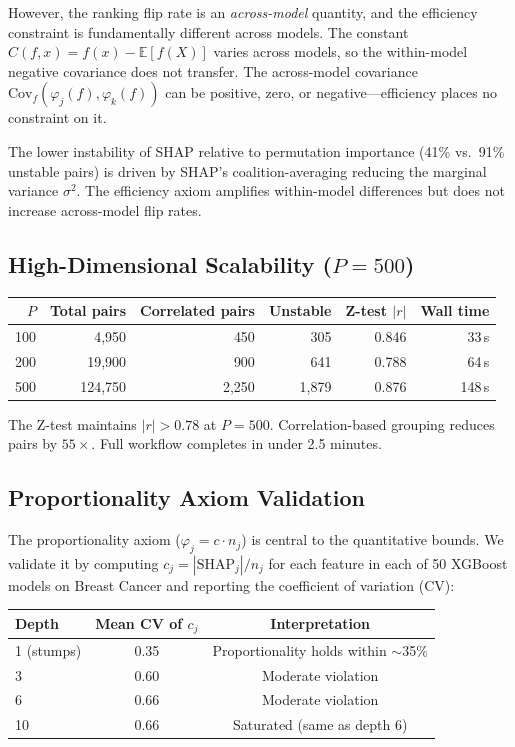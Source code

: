 \documentclass{jmlr}
\newcommand{\E}{\mathbb{E}}
\begin{document}
However, the ranking flip rate is an \emph{across-model} quantity, and the efficiency constraint is fundamentally different across models. The constant $C(f,x) = f(x) - \E[f(X)]$ varies across models, so the within-model negative covariance does not transfer. The across-model covariance $\text{Cov}_f(\varphi_j(f), \varphi_k(f))$ can be positive, zero, or negative---efficiency places no constraint on it.

The lower instability of SHAP relative to permutation importance (41\% vs.\ 91\% unstable pairs) is driven by SHAP's coalition-averaging reducing the marginal variance $\sigma^2$. The efficiency axiom amplifies within-model differences but does not increase across-model flip rates.

\subsection{High-Dimensional Scalability ($P = 500$)}

\begin{center}
\small
\begin{tabular}{@{}rrrrrr@{}}
\toprule
$P$ & Total pairs & Correlated pairs & Unstable & Z-test $|r|$ & Wall time \\
\midrule
100 & 4,950 & 450 & 305 & 0.846 & 33\,s \\
200 & 19,900 & 900 & 641 & 0.788 & 64\,s \\
500 & 124,750 & 2,250 & 1,879 & 0.876 & 148\,s \\
\bottomrule
\end{tabular}
\end{center}

The Z-test maintains $|r| > 0.78$ at $P = 500$. Correlation-based grouping reduces pairs by $55\times$. Full workflow completes in under 2.5 minutes.

\subsection{Proportionality Axiom Validation}

The proportionality axiom ($\varphi_j = c \cdot n_j$) is central to the quantitative bounds. We validate it by computing $c_j = |\text{SHAP}_j| / n_j$ for each feature in each of 50 XGBoost models on Breast Cancer and reporting the coefficient of variation (CV):

\begin{center}
\small
\begin{tabular}{@{}lcc@{}}
\toprule
Depth & Mean CV of $c_j$ & Interpretation \\
\midrule
1 (stumps) & 0.35 & Proportionality holds within $\sim$35\% \\
3 & 0.60 & Moderate violation \\
6 & 0.66 & Moderate violation \\
10 & 0.66 & Saturated (same as depth 6) \\
\bottomrule
\end{tabular}
\end{center}
\end{document}
